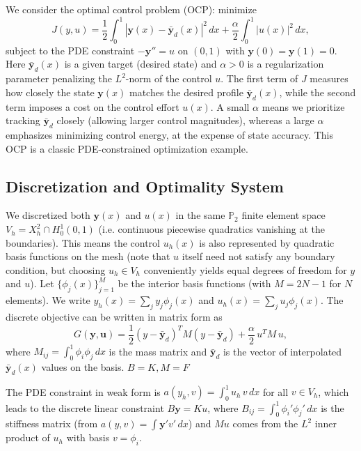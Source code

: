 We consider the optimal control problem (OCP): minimize
\[
	J(y,u) = \frac{1}{2}\int_0^1 |\mathbf{y}(x)-\bar{\mathbf{y}}_d(x)|^2\,dx + \frac{\alpha}{2}\int_0^1 |u(x)|^2\,dx,
\]
subject to the PDE constraint $-\mathbf{y}'' = u$ on $(0,1)$ with $\mathbf{y}(0)=\mathbf{y}(1)=0$. Here $\bar{\mathbf{y}}_d(x)$ is a given target (desired state) and $\alpha>0$ is a regularization parameter penalizing the $L^2$-norm of the control $u$. The first term of $J$ measures how closely the state $\mathbf{y}(x)$ matches the desired profile $\bar{\mathbf{y}}_d(x)$, while the second term imposes a cost on the control effort $u(x)$. A small $\alpha$ means we prioritize tracking $\bar{\mathbf{y}}_d$ closely (allowing larger control magnitudes), whereas a large $\alpha$ emphasizes minimizing control energy, at the expense of state accuracy. This OCP is a classic PDE-constrained optimization example.

\subsection{Discretization and Optimality System}

We discretized both $\mathbf{y}(x)$ and $u(x)$ in the same $\mathbb{P}_2$ finite element space $V_h = X_h^2 \cap H_0^1(0,1)$ (i.e. continuous piecewise quadratics vanishing at the boundaries). This means the control $u_h(x)$ is also represented by quadratic basis functions on the mesh (note that $u$ itself need not satisfy any boundary condition, but choosing $u_h\in V_h$ conveniently yields equal degrees of freedom for $y$ and $u$). Let $\{\phi_j(x)\}_{j=1}^{M}$ be the interior basis functions (with $M=2N-1$ for $N$ elements). We write $y_h(x)=\sum_j y_j\phi_j(x)$ and $u_h(x)=\sum_j u_j\phi_j(x)$. The discrete objective can be written in matrix form as
\[
	G(\mathbf{y},\mathbf{u}) = \frac{1}{2}(y-\bar{\mathbf{y}}_d)^T M(y-\bar{\mathbf{y}}_d) + \frac{\alpha}{2}\,u^T M\,u,
\]
where $M_{ij}=\int_0^1 \phi_i\phi_j\,dx$ is the mass matrix and $\bar{\mathbf{y}}_d$ is the vector of interpolated $\bar{\mathbf{y}}_d(x)$ values on the basis. $B = K, M = F$

The PDE constraint in weak form is $a(y_h,v) = \int_0^1 u_h\,v\,dx$ for all $v\in V_h$, which leads to the discrete linear constraint $B\mathbf{y} = Ku$, where $B_{ij}=\int_0^1 \phi_i'\phi_j'\,dx$ is the stiffness matrix (from $a(y,v)=\int \mathbf{y}'v'\,dx$) and $Mu$ comes from the $L^2$ inner product of $u_h$ with basis $v=\phi_i$.


